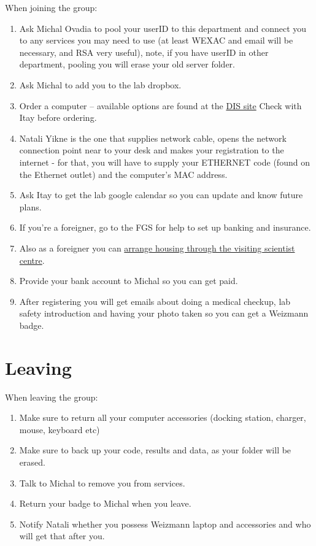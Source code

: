 \documentclass[
]{book}
\providecommand{\tightlist}{%
  \setlength{\itemsep}{0pt}\setlength{\parskip}{0pt}}
\begin{document}
When joining the group:

\begin{enumerate}
\def\labelenumi{\arabic{enumi}.}
\tightlist
\item
  Ask Michal Ovadia to pool your userID to this department and connect you to any services you may need to use (at least WEXAC and email will be necessary, and RSA very useful), note, if you have userID in other department, pooling you will erase your old server folder.
\item
  Ask Michal to add you to the lab dropbox.
\item
  Order a computer -- available options are found at the \href{http://www.weizmann.ac.il/DIS/computing-hardware/pc/windows-laptops}{DIS site}
  Check with Itay before ordering.
\item
  Natali Yikne is the one that supplies network cable, opens the network connection point near to your desk and makes your registration to the internet - for that, you will have to supply your ETHERNET code (found on the Ethernet outlet) and the computer's MAC address.
\item
  Ask Itay to get the lab google calendar so you can update and know future plans.
\item
  If you're a foreigner, go to the FGS for help to set up banking and insurance.
\item
  Also as a foreigner you can \href{http://www.weizmann.ac.il/vs/}{arrange housing through the visiting scientist centre}.
\item
  Provide your bank account to Michal so you can get paid.
\item
  After registering you will get emails about doing a medical checkup, lab safety introduction and having your photo taken so you can get a Weizmann badge.
\end{enumerate}

\hypertarget{leaving}{%
\section{Leaving}\label{leaving}}

When leaving the group:

\begin{enumerate}
\def\labelenumi{\arabic{enumi}.}
\tightlist
\item
  Make sure to return all your computer accessories (docking station, charger, mouse, keyboard etc)
\item
  Make sure to back up your code, results and data, as your folder will be erased.
\item
  Talk to Michal to remove you from services.
\item
  Return your badge to Michal when you leave.
\item
  Notify Natali whether you possess Weizmann laptop and accessories and who will get that after you.
\end{enumerate}
\end{document}
